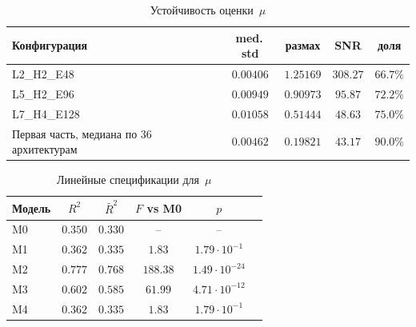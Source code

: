 \begin{table}[htbp]
\centering
\caption{Устойчивость оценки~$\mu$}
\label{ch1emp:tab:noise-floor}
\footnotesize
\setlength{\tabcolsep}{3pt}
\begin{tabularx}{\linewidth}{|>{\raggedright\arraybackslash}X|c|c|c|c|}
\hline
Конфигурация & med.\,std & размах & SNR & доля \\
\hline
L2\_H2\_E48 & $0.00406$ & $1.25169$ & $308.27$ & $66.7\%$ \\
L5\_H2\_E96 & $0.00949$ & $0.90973$ & $95.87$ & $72.2\%$ \\
L7\_H4\_E128 & $0.01058$ & $0.51444$ & $48.63$ & $75.0\%$ \\
Первая часть, медиана по 36 архитектурам & $0.00462$ & $0.19821$ & $43.17$ & $90.0\%$ \\
\hline
\end{tabularx}
\end{table}

\begin{table}[htbp]
\centering
\caption{Линейные спецификации для~$\mu$}
\label{ch1emp:tab:reg-summary}
\footnotesize
\setlength{\tabcolsep}{3pt}
\begin{tabularx}{\linewidth}{|l|c|c|c|c|>{\raggedright\arraybackslash}X|}
\hline
Модель & $R^2$ & $\bar R^2$ & $F$ vs M0 & $p$ \\
\hline
M0 & $0.350$ & $0.330$ & -- & -- \\
M1 & $0.362$ & $0.335$ & $1.83$ & $1.79\cdot 10^{-1}$ \\
M2 & $0.777$ & $0.768$ & $188.38$ & $1.49\cdot 10^{-24}$ \\
M3 & $0.602$ & $0.585$ & $61.99$ & $4.71\cdot 10^{-12}$ \\
M4 & $0.362$ & $0.335$ & $1.83$ & $1.79\cdot 10^{-1}$ \\
\hline
\end{tabularx}
\end{table}


